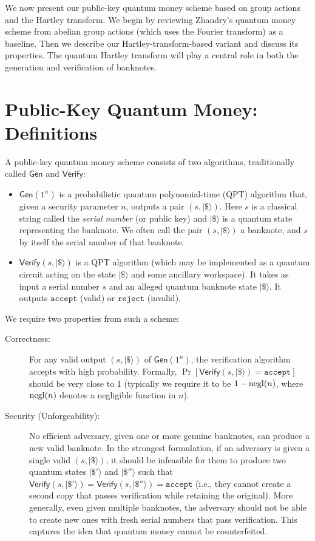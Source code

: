 \documentclass[12pt]{report}
\begin{document}
We now present our public-key quantum money scheme based on group actions and the Hartley transform. We begin by reviewing Zhandry’s quantum money scheme from abelian group actions (which uses the Fourier transform) as a baseline. Then we describe our Hartley-transform-based variant and discuss its properties. The quantum Hartley transform will play a central role in both the generation and verification of banknotes.

\section{Public-Key Quantum Money: Definitions}
A public-key quantum money scheme consists of two algorithms, traditionally called $\mathsf{Gen}$ and $\mathsf{Verify}$:
\begin{itemize}
    \item $\mathsf{Gen}(1^n)$ is a probabilistic quantum polynomial-time (QPT) algorithm that, given a security parameter $n$, outputs a pair $(s, |\$\rangle)$. Here $s$ is a classical string called the \emph{serial number} (or public key) and $|\$\rangle$ is a quantum state representing the banknote. We often call the pair $(s, |\$\rangle)$ a banknote, and $s$ by itself the serial number of that banknote.
    \item $\mathsf{Verify}(s, |\$\rangle)$ is a QPT algorithm (which may be implemented as a quantum circuit acting on the state $|\$\rangle$ and some ancillary workspace). It takes as input a serial number $s$ and an alleged quantum banknote state $|\$\rangle$. It outputs $\mathtt{accept}$ (valid) or $\mathtt{reject}$ (invalid).
\end{itemize}

We require two properties from such a scheme:
\begin{description}
    \item[Correctness:] For any valid output $(s, |\$\rangle)$ of $\mathsf{Gen}(1^n)$, the verification algorithm accepts with high probability. Formally, $\Pr[\mathsf{Verify}(s, |\$\rangle) = \mathtt{accept}]$ should be very close to 1 (typically we require it to be $1 - \operatorname{negl}(n)$, where $\operatorname{negl}(n)$ denotes a negligible function in $n$).
    \item[Security (Unforgeability):] No efficient adversary, given one or more genuine banknotes, can produce a new valid banknote. In the strongest formulation, if an adversary is given a single valid $(s, |\$\rangle)$, it should be infeasible for them to produce two quantum states $|\$'\rangle$ and $|\$''\rangle$ such that $\mathsf{Verify}(s, |\$'\rangle) = \mathsf{Verify}(s, |\$''\rangle) = \mathtt{accept}$ (i.e., they cannot create a second copy that passes verification while retaining the original). More generally, even given multiple banknotes, the adversary should not be able to create new ones with fresh serial numbers that pass verification. This captures the idea that quantum money cannot be counterfeited.
\end{description}
\end{document}
